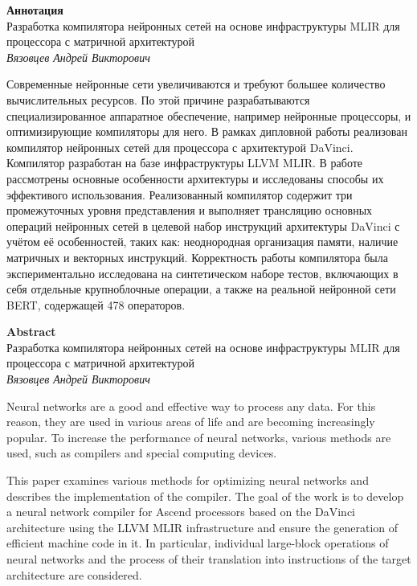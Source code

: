 \begin{center}
\textbf{Аннотация} \\[0.3 cm]
Разработка компилятора нейронных сетей на основе инфраструктуры MLIR для процессора с матричной архитектурой \\
\textit{Вязовцев Андрей Викторович} \\[1 cm]
\end{center}

Современные нейронные сети увеличиваются и требуют большее количество
вычислительных ресурсов. По этой причине разрабатываются специализированное
аппаратное обеспечение, например нейронные процессоры, и оптимизирующие
компиляторы для него. В рамках дипловной работы реализован компилятор нейронных
сетей для процессора с архитектурой DaVinci. Компилятор разработан на базе
инфраструктуры LLVM MLIR. В работе рассмотрены
основные особенности архитектуры и исследованы способы их эффективого
использования. Реализованный компилятор содержит три промежуточных уровня
представления и выполняет трансляцию основных операций
нейронных сетей в целевой набор инструкций архитектуры DaVinci с учётом её
особенностей, таких как: неоднородная организация памяти, наличие матричных и векторных
инструкций. Корректность работы компилятора была экспериментально исследована на
синтетическом наборе тестов, включающих в себя отдельные крупноблочные операции,
а также на реальной нейронной сети BERT, содержащей 478 операторов. \\[1 cm]

\newpage

\begin{center}
    \textbf{Abstract} \\[0.3 cm]
    Разработка компилятора нейронных сетей на основе инфраструктуры MLIR для процессора с матричной архитектурой \\
    \textit{Вязовцев Андрей Викторович} \\[1 cm]
\end{center}

Neural networks are a good and effective way to process any data.
For this reason, they are used in various areas of life and are becoming
increasingly popular. To increase the performance of neural networks, various
methods are used, such as compilers and special computing devices.

This paper examines various methods for optimizing neural networks and describes
the implementation of the compiler. The goal of the work is to develop a neural
network compiler for Ascend processors based on the DaVinci architecture using
the LLVM MLIR infrastructure and ensure the generation of efficient machine code
in it. In particular, individual large-block operations of neural networks and
the process of their translation into instructions of the target architecture
are considered.

\newpage